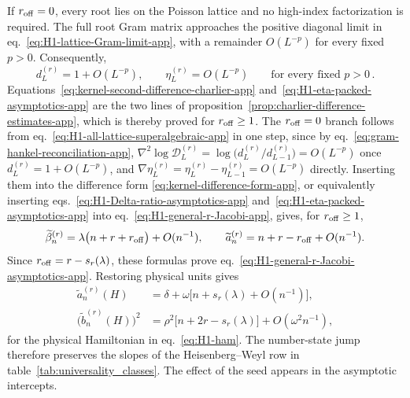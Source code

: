 \documentclass[a4paper,11pt]{article}
\theoremstyle{definition}
\theoremstyle{remark}
\begin{document}
If \(r_{\rm off}=0\), every root lies on the Poisson lattice and
no high-index factorization is required. The full root Gram matrix
approaches the positive diagonal limit in
eq.~\eqref{eq:H1-lattice-Gram-limit-app}, with a remainder
\(O(L^{-p})\) for every fixed \(p>0\). Consequently,
\begin{equation}
   d_L^{(r)}=1+O(L^{-p}),\qquad
   \eta_L^{(r)}=O(L^{-p})
   \qquad\text{for every fixed }p>0\,.
   \label{eq:H1-all-lattice-superalgebraic-app}
\end{equation}
Equations~\eqref{eq:kernel-second-difference-charlier-app}
and~\eqref{eq:H1-eta-packed-asymptotics-app} are the two lines of
proposition~\ref{prop:charlier-difference-estimates-app}, which is thereby proved for
$r_{\rm off}\ge1$. The $r_{\rm off}=0$ branch follows from
eq.~\eqref{eq:H1-all-lattice-superalgebraic-app} in one step, since by
eq.~\eqref{eq:gram-hankel-reconciliation-app},
$\nabla^2\log\mathcal D_L^{(r)}=\log\bigl(d_L^{(r)}/d_{L-1}^{(r)}\bigr)=O(L^{-p})$ once
$d_L^{(r)}=1+O(L^{-p})$, and $\nabla\eta_L^{(r)}=\eta_L^{(r)}-\eta_{L-1}^{(r)}=O(L^{-p})$
directly. Inserting them into the
difference form \eqref{eq:kernel-difference-form-app}, or equivalently inserting
eqs.~\eqref{eq:H1-Delta-ratio-asymptotics-app} and~\eqref{eq:H1-eta-packed-asymptotics-app} into
eq.~\eqref{eq:H1-general-r-Jacobi-app}, gives, for $r_{\rm off}\ge1$,
\begin{equation}
   \widetilde\beta_n^{(r)}
   =\lambda\bigl(n+r+r_{\rm off}\bigr)+O(n^{-1}),
   \qquad
   \widetilde a_n^{(r)}
   =n+r-r_{\rm off}+O(n^{-1}).
\end{equation}
Since \(r_{\rm off}=r-s_r(\lambda)\), these formulas prove
eq.~\eqref{eq:H1-general-r-Jacobi-asymptotics-app}. Restoring physical
units gives
\begin{equation}
\begin{aligned}
   \widetilde a_n^{(r)}(H)
   &=\delta+\omega\bigl[n+s_r(\lambda)+O(n^{-1})\bigr],\\
   \bigl(\widetilde b_n^{(r)}(H)\bigr)^2
   &=\rho^2\bigl[n+2r-s_r(\lambda)\bigr]
   +O(\omega^2n^{-1}),
\end{aligned}
   \label{eq:H1-general-r-Jacobi-asymptotics-physical-app}
\end{equation}
for the physical Hamiltonian in eq.~\eqref{eq:H1-ham}. The number-state jump therefore preserves the slopes of the
Heisenberg--Weyl row in table~\ref{tab:universality_classes}. The
effect of the seed appears in the asymptotic intercepts.
\end{document}
